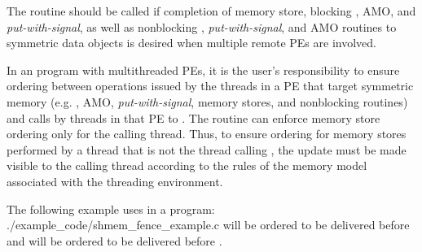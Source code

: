 \begin{apidefinition}
{    The  routine should be called if completion of memory
    store, blocking \PUT{}, \ac{AMO}, and \emph{put-with-signal}, as well as
    nonblocking \PUT{}, \emph{put-with-signal}, and \ac{AMO} routines to symmetric data objects is desired
    when multiple remote \acp{PE} are involved.

    In an \openshmem program with multithreaded \acp{PE}, it is the
    user's responsibility to ensure ordering between operations issued by the threads
    in a \ac{PE} that target symmetric memory (e.g. \PUT{}, \ac{AMO}, \emph{put-with-signal}, memory stores,
    and nonblocking routines) and calls by threads in that \ac{PE} to
    . The  routine can enforce memory store ordering only for the
    calling thread. Thus, to ensure ordering for memory stores performed by a thread that is
    not the thread calling , the update must be made visible to the
    calling thread according to the rules of the memory model associated with
    the threading environment.
}

\begin{apiexamples}

\apicexample
    {The following example uses  in a \Cstd[11] program: }
    {./example_code/shmem_fence_example.c}
    { will be ordered to be delivered before  and 
    will be ordered to be delivered before .}

\end{apiexamples}

\end{apidefinition}
